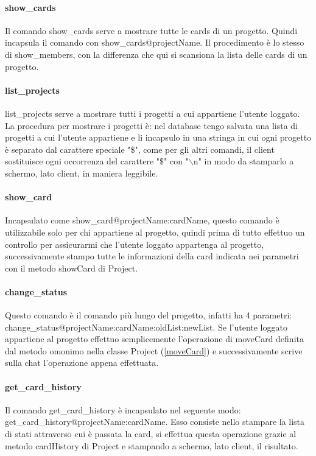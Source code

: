 \documentclass[]{article}
\begin{document}
\paragraph{show\_cards}
Il comando show\_cards serve a mostrare tutte le cards di un progetto. Quindi incapsula il comando con show\_cards@projectName. Il procedimento è lo stesso di show\_members, con la differenza che qui si scansiona la lista delle cards di un progetto.
\paragraph{list\_projects}
list\_projects serve a mostrare tutti i progetti a cui appartiene l'utente loggato. La procedura per mostrare i progetti è: nel database tengo salvata una lista di progetti a cui l'utente appartiene e li incapsulo in una stringa in cui ogni progetto è separato dal carattere speciale "\$", come per gli altri comandi, il client sostituisce ogni occorrenza del carattere "\$" con "$\backslash$n" in modo da stamparlo a schermo, lato client, in maniera leggibile.
\paragraph{show\_card}
Incapsulato come show\_card@projectName:cardName,
questo comando è utilizzabile solo per chi appartiene al progetto, quindi prima di tutto effettuo un controllo per assicurarmi che l'utente loggato appartenga al progetto, successivamente stampo tutte le informazioni della card indicata nei parametri con il metodo showCard di Project.
\paragraph{change\_status}
Questo comando è il comando più lungo del progetto, infatti ha 4 parametri:\\
change\_status@projectName:cardName:oldList:newList. Se l'utente loggato appartiene al progetto effettuo semplicemente l'operazione di moveCard definita dal metodo omonimo nella classe Project (\autoref{moveCard}) e successivamente scrive sulla chat l'operazione appena effettuata.
\paragraph{get\_card\_history}
Il comando get\_card\_history è incapsulato nel seguente modo:\\
get\_card\_history@projectName:cardName. Esso consiste nello stampare la lista di stati attraverso cui è passata la card, si effettua questa operazione grazie al metodo cardHistory di Project e stampando a schermo, lato client, il risultato.
\end{document}
